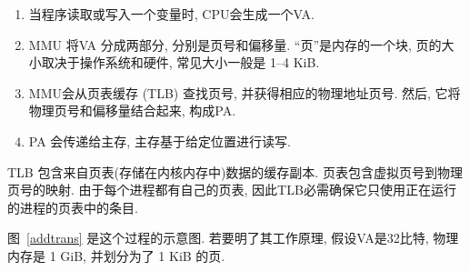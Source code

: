 \documentclass[12pt]{book}
\begin{document}
{\begin{enumerate}

%
%
%
\item 当程序读取或写入一个变量时, CPU会生成一个VA.

\item MMU 将VA 分成两部分, 分别是页号和偏移量.
``页''是内存的一个块, 页的大小取决于操作系统和硬件, 常见大小一般是 1--4 KiB.

\item MMU会从页表缓存 (TLB) 查找页号, 并获得相应的物理地址页号.
然后, 它将物理页号和偏移量结合起来, 构成PA.

\item PA 会传递给主存, 主存基于给定位置进行读写.

\end{enumerate}

%
TLB 包含来自页表(存储在内核内存中)数据的缓存副本.
页表包含虚拟页号到物理页号的映射. 
由于每个进程都有自己的页表, 因此TLB必需确保它只使用正在运行的进程的页表中的条目.

图~\ref{addtrans} 是这个过程的示意图.
若要明了其工作原理, 假设VA是32比特, 物理内存是 1 GiB, 并划分为了 1 KiB 的页.

\begin{itemize}


\end{itemize}}
\end{document}
